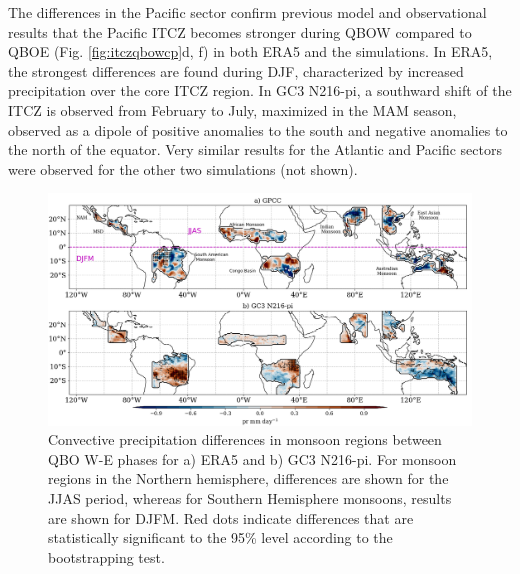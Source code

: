  The differences in the Pacific sector confirm previous model and observational results \citep{gray2018,serva2021} that the Pacific ITCZ becomes stronger during QBOW compared to QBOE (Fig. \ref{fig:itczqbowcp}d, f) in both ERA5 and the simulations. In ERA5, the strongest differences are found during DJF, characterized by increased precipitation over the core ITCZ region. In GC3 N216-pi, a southward shift of the ITCZ is observed from February to July, maximized in the MAM season, observed as a dipole of positive anomalies to the south and negative anomalies to the north of the equator. Very similar results for the Atlantic and Pacific sectors were observed for the other two simulations (not shown).


\begin{figure}[t!]
\centering
 \includegraphics[width=\linewidth]{figures/monsoon_gpcc_qbow.png}
\caption[Global monsoon impacts of the QBO.]{ Convective precipitation differences in monsoon regions between QBO W-E  phases for a) ERA5 and b) GC3 N216-pi. For monsoon regions in the Northern hemisphere, differences are shown for the JJAS period, whereas for Southern Hemisphere monsoons, results are shown for DJFM.  Red dots indicate differences that are statistically significant to the 95\% level according to the bootstrapping test.}
\label{fig:mons_map}
\end{figure}

